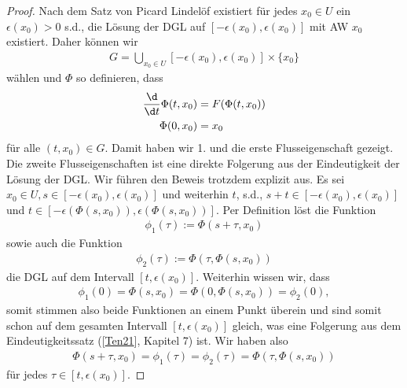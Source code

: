 \documentclass[letterpaper,10pt,english]{jupyterBook}
\begin{document}
\begin{proof}
 Nach dem Satz von Picard Lindelöf existiert für jedes \(x_0\in U\) ein \(\epsilon(x_0)>0\) s.d., die Lösung der DGL
auf \([-\epsilon(x_0),\epsilon(x_0)]\) mit AW \(x_0\) existiert. Daher können wir
\begin{align*}
G = \bigcup_{x_0\in U} [-\epsilon(x_0),\epsilon(x_0)] \times\{x_0\}
\end{align*}
wählen und \(\Phi\) so definieren, dass
\begin{align*}
\frac{\d}{\d t} \Phi(t, x_0) &= F(\Phi(t, x_0))\\
\Phi(0, x_0) &= x_0
\end{align*}
für alle \((t, x_0)\in G\). Damit haben wir 1. und die erste Flusseigenschaft gezeigt. Die zweite Flusseigenschaften ist eine direkte Folgerung aus der Eindeutigkeit der Lösung der DGL. Wir führen den Beweis trotzdem explizit aus. Es sei \(x_0\in U, s\in [-\epsilon(x_0), \epsilon(x_0)]\) und weiterhin \(t\), s.d., \(s+t \in [-\epsilon(x_0), \epsilon(x_0)]\) und \(t\in [-\epsilon(\Phi(s,x_0)), \epsilon(\Phi(s,x_0))]\).
Per Definition löst die Funktion
\begin{align*}
\phi_1(\tau) := \Phi(s + \tau, x_0)
\end{align*}
sowie auch die Funktion
\begin{align*}
\phi_2(\tau) := \Phi(\tau, \Phi(s,x_0))
\end{align*}
die DGL auf dem Intervall \([t, \epsilon(x_0)]\). Weiterhin wissen wir, dass
\begin{align*}
\phi_1(0) = \Phi(s, x_0) = \Phi(0, \Phi(s, x_0)) = \phi_2(0),
\end{align*}
somit stimmen also beide Funktionen an einem Punkt überein und sind somit schon auf dem gesamten Intervall \([t, \epsilon(x_0)]\) gleich, was
eine Folgerung aus dem Eindeutigkeitssatz ({[}\hyperlink{cite.references:id7}{Ten21}{]}, Kapitel 7) ist. Wir haben also
\begin{align*}
\Phi(s + \tau, x_0) = \phi_1(\tau) = \phi_2(\tau) = \Phi(\tau, \Phi(s,x_0))
\end{align*}
für jedes \(\tau\in [t, \epsilon(x_0)]\).
\end{proof}
\end{document}
